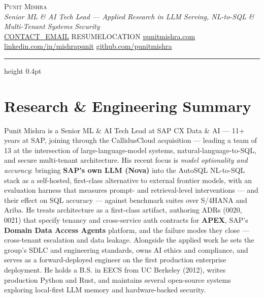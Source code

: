 \documentclass[11pt,letterpaper]{article}
\begin{document}
\begin{center}
  {\huge\scshape Punit Mishra}\\[4pt]
  {\itshape Senior ML \& AI Tech Lead --- Applied Research in LLM Serving, NL-to-SQL \& Multi-Tenant Systems Security}\\[6pt]
  {\small
    \href{mailto:CONTACT_EMAIL}{CONTACT\_EMAIL} \;\textbar\;
    RESUMELOCATION \;\textbar\;
    \href{https://punitmishra.com}{punitmishra.com} \;\textbar\;
    \href{https://linkedin.com/in/mishrapunit}{linkedin.com/in/mishrapunit} \;\textbar\;
    \href{https://github.com/punitmishra}{github.com/punitmishra}
  }
\end{center}
\vspace{2pt}\hrule height 0.4pt\vspace{2pt}

\section{Research \& Engineering Summary}
Punit Mishra is a Senior ML \& AI Tech Lead at SAP CX Data \& AI --- 11+ years at SAP, joining through
the CallidusCloud acquisition --- leading a team of 13 at the intersection of large-language-model
systems, natural-language-to-SQL, and secure multi-tenant architecture. His recent focus is
\emph{model optionality and accuracy}: bringing \textbf{SAP's own LLM (Nova)} into the AutoSQL NL-to-SQL
stack as a self-hosted, first-class alternative to external frontier models, with an evaluation harness
that measures prompt- and retrieval-level interventions --- and their effect on SQL accuracy --- against
benchmark suites over S/4HANA and Ariba. He treats architecture as a first-class artifact, authoring
ADRs (0020, 0021) that specify tenancy and cross-service auth contracts for \textbf{APEX}, SAP's
\textbf{Domain Data Access Agents} platform, and the failure modes they close --- cross-tenant
escalation and data leakage. Alongside the applied work he sets the group's SDLC and engineering
standards, owns AI ethics and compliance, and serves as a forward-deployed engineer on the first
production enterprise deployment. He holds a B.S. in EECS from UC Berkeley (2012), writes production
Python and Rust, and maintains several open-source systems exploring local-first LLM memory and
hardware-backed security.

\end{document}
